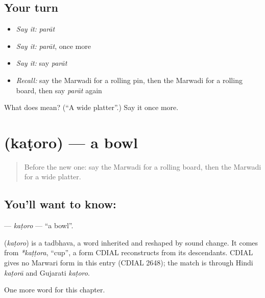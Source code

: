 \subsection*{Your turn}
\begin{itemize}
\raggedright
  \item \emph{Say it:} \emph{parāt}
  \item \emph{Say it:} \emph{parāt}, once more
  \item \emph{Say it:} say \emph{parāt}
  \item \emph{Recall:} say the Marwadi for a rolling pin, then the Marwadi for a rolling board, then say \emph{parāt} again
\end{itemize}

\begin{tcolorbox}[breakable,colback=teal!4,colframe=teal!35!black,title={Before you move on}]
What does  mean? (\textquotedblleft{}A wide platter\textquotedblright{}.) Say it once more.
\end{tcolorbox}
\section[\texorpdfstring{\mw{कटोरो} (kaṭoro)}{कटोरो (kaṭoro)}]{ (kaṭoro) — a bowl}

\label{lesson:MW-C121-katoro}



\begin{quote}
Before the new one: say the Marwadi for a rolling board, then the Marwadi for a wide platter.
\end{quote}

\subsection*{You'll want to know: }
\textbf{} — \emph{kaṭoro} — \textquotedblleft{}a bowl\textquotedblright{}.

\begin{cousinweb}
\textbf{} (\emph{kaṭoro}) is a tadbhava, a word inherited and reshaped by sound change. It comes from \emph{*kaṭṭora}, \textquotedblleft{}cup\textquotedblright{}, a form CDIAL reconstructs from its descendants. CDIAL gives no Marwari form in this entry (CDIAL 2648); the match is through Hindi \emph{kaṭorā} and Gujarati \emph{kaṭoro}.
\end{cousinweb}

\begin{grammarlens}[title={What you've built}]
One more word for this chapter.
\end{grammarlens}

